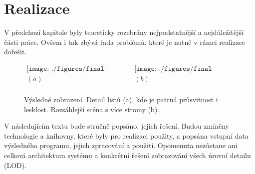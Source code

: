 \chapter{Realizace}
\label{chap:realizace}

V předchozí kapitole byly teoreticky rozebrány nejpodstatnější a nejdůležitější části práce. Ovšem i tak zbývá řada problémů, které je nutné v rámci realizace dořešit. 

\begin{figure}[here]
\begin{center}
$\begin{array}{cc}
\texttt{[image: ./figures/final-leaves\_H.png]}&
\texttt{[image: ./figures/final-trees\_H.png]}\\
(a)&(b)\\
\end{array}$
\caption[Ukázka výsledného zobrazení]%
{Výsledné zobrazení. Detail listů (a), kde je patrná průsvitnost i lesklost. Rozsáhlejší scéna s více stromy (b).\label{fig:resultA}
}
\end{center}
\end{figure}
V následujícím textu bude stručně popsáno, jejich řešení. Budou zmíněny technologie a knihovny, které byly pro realizaci použity, a popsána vstupní data výsledného programu, jejich zpracování a použití. Opomenuta nezůstane ani celková architektura systému a konkrétní řešení zobrazování všech úrovní detailu (LOD).

\pagebreak










